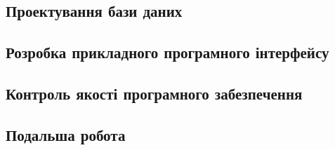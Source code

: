 \documentclass[a4paper,14pt]{extarticle} %
\begin{document}
\subsection{Проектування бази даних}


\subsection{Розробка прикладного програмного інтерфейсу} 






\subsection{Контроль якості програмного забезпечення}



\subsection{Подальша робота}



\end{document}

